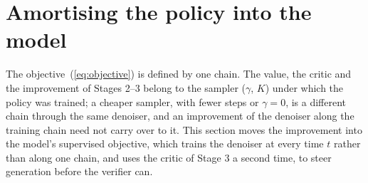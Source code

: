 \section{Amortising the policy into the model}
\label{sec:loop}
The objective~(\ref{eq:objective}) is defined by one chain. The value, the critic and the improvement of Stages 2--3 belong to the sampler ($\gamma$, $K$) under which the policy was trained; a cheaper sampler, with fewer steps or $\gamma=0$, is a different chain through the same denoiser, and an improvement of the denoiser along the training chain need not carry over to it. This section moves the improvement into the model's supervised objective, which trains the denoiser at every time $t$ rather than along one chain, and uses the critic of Stage 3 a second time, to steer generation before the verifier can.

